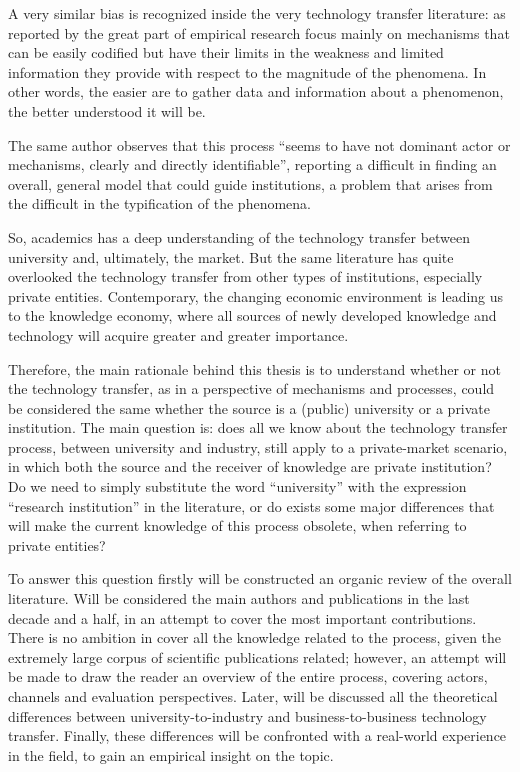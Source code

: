A very similar bias is recognized inside the very technology transfer literature: as reported by \citet{Muscio2008} the great part of empirical research focus mainly on mechanisms that can be easily codified but have their limits in the weakness and limited information they provide with respect to the magnitude of the phenomena. In other words, the easier are to gather data and information about a phenomenon, the better understood it will be. 

The same author observes that this process \enquote{seems to have not dominant actor or mechanisms, clearly and directly identifiable}, reporting a difficult in finding an overall, general model that could guide institutions, a problem that arises from the difficult in the typification of the phenomena.

So, academics has a deep understanding of the technology transfer between university and, ultimately, the market. But the same literature has quite overlooked the technology transfer from other types of institutions, especially private entities. Contemporary, the changing economic environment is leading us to the knowledge economy, where all sources of newly developed knowledge and technology will acquire greater and greater importance. 

Therefore, the main rationale behind this thesis is to understand whether or not the technology transfer, as in a perspective of mechanisms and processes, could be considered the same whether the source is a (public) university or a private institution. The main question is: does all we know about the technology transfer process, between university and industry, still apply to a private-market scenario, in which both the source and the receiver of knowledge are private institution? Do we need to simply substitute the word \enquote{university} with the expression \enquote{research institution} in the literature, or do exists some major differences that will make the current knowledge of this process obsolete, when referring to private entities?

To answer this question firstly will be constructed an organic review of the overall literature. Will be considered the main authors and publications in the last decade and a half, in an attempt to cover the most important contributions. There is no ambition in cover all the knowledge related to the process, given the extremely large corpus of scientific publications related; however, an attempt will be made to draw the reader an overview of the entire process, covering actors, channels and evaluation perspectives. Later, will be discussed all the theoretical differences between university-to-industry and business-to-business technology transfer. Finally, these differences will be confronted with a real-world experience in the field, to gain an empirical insight on the topic.
